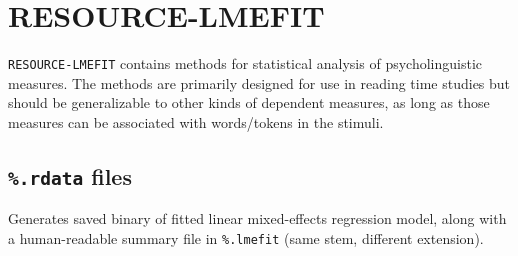 \documentclass[12pt]{report}
\def\blue{\color{blue}}
\begin{document}
\chapter{RESOURCE-LMEFIT}

{\tt RESOURCE-LMEFIT} contains methods for statistical analysis of psycholinguistic measures. The methods are primarily designed for use in reading time studies but should be generalizable to other kinds of dependent measures, as long as those measures can be associated with words/tokens in the stimuli.


\section{{\blue\tt \%.rdata} files}

Generates saved binary of fitted linear mixed-effects regression model, along with a human-readable summary file in {\blue\tt \%.lmefit} (same stem, different extension).
\end{document}
